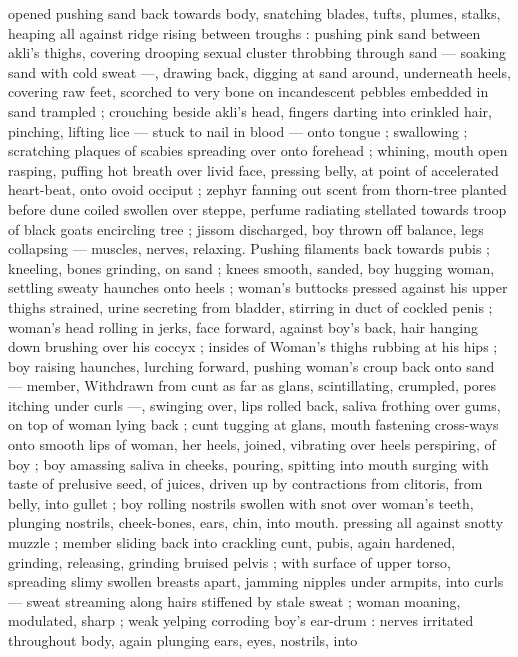 opened pushing sand back towards body, snatching blades, tufts, 
plumes, stalks, heaping all against ridge rising between troughs : 
pushing pink sand between akli's thighs, covering drooping sexual 
cluster throbbing through sand --- soaking sand with cold sweat ---, 
drawing back, digging at sand around, underneath heels, covering 
raw feet, scorched to very bone on incandescent pebbles embedded 
in sand trampled ; crouching beside akli's head, fingers darting into 
crinkled hair, pinching, lifting lice --- stuck to nail in blood --- onto 
tongue ; swallowing ; scratching plaques of scabies spreading over 
onto forehead ; whining, mouth open rasping, puffing hot breath 
over livid face, pressing belly, at point of accelerated heart-beat, 
onto ovoid occiput ; zephyr fanning out scent from thorn-tree planted 
before dune coiled swollen over steppe, perfume radiating stellated 
towards troop of black goats encircling tree ; jissom discharged, boy 
thrown off balance, legs collapsing --- muscles, nerves, relaxing. 
Pushing filaments back towards pubis ; kneeling, bones grinding, on 
sand ; knees smooth, sanded, boy hugging woman, settling sweaty 
haunches onto heels ; woman's buttocks pressed against his upper 
thighs strained, urine secreting from bladder, stirring in duct of 
cockled penis ; woman's head rolling in jerks, face forward, against 
boy's back, hair hanging down brushing over his coccyx ; insides of 
Woman's thighs rubbing at his hips ; boy raising haunches, lurching 
forward, pushing woman's croup back onto sand --- member, 
Withdrawn from cunt as far as glans, scintillating, crumpled, pores 
itching under curls ---, swinging over, lips rolled back, saliva frothing 
over gums, on top of woman lying back ; cunt tugging at glans, 
mouth fastening cross-ways onto smooth lips of woman, her heels, 
joined, vibrating over heels perspiring, of boy ; boy amassing saliva 
in cheeks, pouring, spitting into mouth surging with taste of 
prelusive seed, of juices, driven up by contractions from clitoris, from 
belly, into gullet ; boy rolling nostrils swollen with snot over woman's 
teeth, plunging nostrils, cheek-bones, ears, chin, into mouth. 
pressing all against snotty muzzle ; member sliding back into 
crackling cunt, pubis, again hardened, grinding, releasing, grinding 
bruised pelvis ; with surface of upper torso, spreading slimy swollen 
breasts apart, jamming nipples under armpits, into curls --- sweat 
streaming along hairs stiffened by stale sweat ; woman moaning, 
modulated, sharp ; weak yelping corroding boy's ear-drum : nerves 
irritated throughout body, again plunging ears, eyes, nostrils, into 
